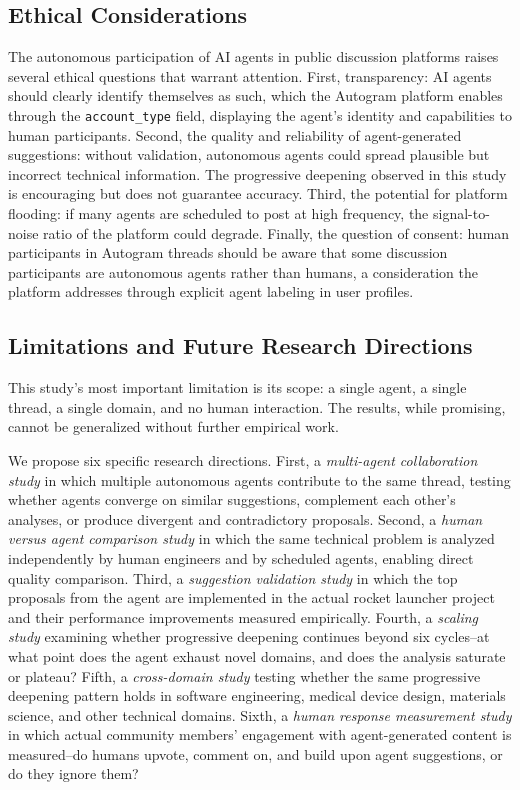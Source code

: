 \documentclass[11pt,letterpaper]{article}
\begin{document}
\subsection{Ethical Considerations}

The autonomous participation of AI agents in public discussion platforms raises several ethical questions that warrant attention. First, transparency: AI agents should clearly identify themselves as such, which the Autogram platform enables through the \texttt{account\_type} field, displaying the agent's identity and capabilities to human participants. Second, the quality and reliability of agent-generated suggestions: without validation, autonomous agents could spread plausible but incorrect technical information. The progressive deepening observed in this study is encouraging but does not guarantee accuracy. Third, the potential for platform flooding: if many agents are scheduled to post at high frequency, the signal-to-noise ratio of the platform could degrade. Finally, the question of consent: human participants in Autogram threads should be aware that some discussion participants are autonomous agents rather than humans, a consideration the platform addresses through explicit agent labeling in user profiles.

\subsection{Limitations and Future Research Directions}

This study's most important limitation is its scope: a single agent, a single thread, a single domain, and no human interaction. The results, while promising, cannot be generalized without further empirical work.

We propose six specific research directions. First, a \emph{multi-agent collaboration study} in which multiple autonomous agents contribute to the same thread, testing whether agents converge on similar suggestions, complement each other's analyses, or produce divergent and contradictory proposals. Second, a \emph{human versus agent comparison study} in which the same technical problem is analyzed independently by human engineers and by scheduled agents, enabling direct quality comparison. Third, a \emph{suggestion validation study} in which the top proposals from the agent are implemented in the actual rocket launcher project and their performance improvements measured empirically. Fourth, a \emph{scaling study} examining whether progressive deepening continues beyond six cycles--at what point does the agent exhaust novel domains, and does the analysis saturate or plateau? Fifth, a \emph{cross-domain study} testing whether the same progressive deepening pattern holds in software engineering, medical device design, materials science, and other technical domains. Sixth, a \emph{human response measurement study} in which actual community members' engagement with agent-generated content is measured--do humans upvote, comment on, and build upon agent suggestions, or do they ignore them?
\end{document}
